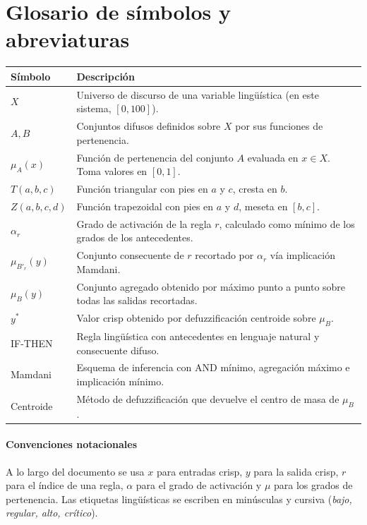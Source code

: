 \section*{Glosario de símbolos y abreviaturas}

\begin{tabularx}{\linewidth}{l X}
\toprule
\textbf{Símbolo} & \textbf{Descripción}\\
\midrule
$X$ & Universo de discurso de una variable lingüística (en este sistema, $[0,100]$).\\
$A,B$ & Conjuntos difusos definidos sobre $X$ por sus funciones de pertenencia.\\
$\mu_A(x)$ & Función de pertenencia del conjunto $A$ evaluada en $x \in X$. Toma valores en $[0,1]$.\\
$T(a,b,c)$ & Función triangular con pies en $a$ y $c$, cresta en $b$.\\
$Z(a,b,c,d)$ & Función trapezoidal con pies en $a$ y $d$, meseta en $[b,c]$.\\
$\alpha_r$ & Grado de activación de la regla $r$, calculado como mínimo de los grados de los antecedentes.\\
$\mu_{B'_r}(y)$ & Conjunto consecuente de $r$ recortado por $\alpha_r$ vía implicación Mamdani.\\
$\mu_B(y)$ & Conjunto agregado obtenido por máximo punto a punto sobre todas las salidas recortadas.\\
$y^*$ & Valor crisp obtenido por defuzzificación centroide sobre $\mu_B$.\\
IF-THEN & Regla lingüística con antecedentes en lenguaje natural y consecuente difuso.\\
Mamdani & Esquema de inferencia con AND mínimo, agregación máximo e implicación mínimo.\\
Centroide & Método de defuzzificación que devuelve el centro de masa de $\mu_B$.\\
\bottomrule
\end{tabularx}

\paragraph{Convenciones notacionales}
A lo largo del documento se usa $x$ para entradas crisp, $y$ para la salida crisp, $r$ para el índice de una regla, $\alpha$ para el grado de activación y $\mu$ para los grados de pertenencia. Las etiquetas lingüísticas se escriben en minúsculas y cursiva (\emph{bajo, regular, alto, crítico}).
\newpage

